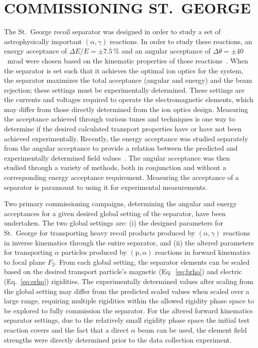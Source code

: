 \chapter{COMMISSIONING ST.\ GEORGE}

The St.\ George recoil separator was designed in order to study a set of
astrophysically important $(\alpha,\gamma)$ reactions. In order to study these
reactions, an energy acceptance of $\Delta E/E = \pm7.5$\,\% and an angular
acceptance of $\Delta\theta = \pm40$~mrad were chosen based on the kinematic
properties of those reactions~\cite{Couder2008}. When the separator is set
such that it achieves the optimal ion optics for the system, the separator
maximizes the total acceptance (angular and energy) and the beam rejection;
these settings must be experimentally determined. These settings are the
currents and voltages required to operate the electromagnetic elements, which
may differ from those directly determined from the ion optics design.
Measuring the acceptance achieved through various tunes and techniques is one
way to determine if the desired calculated transport properties have or have
not been achieved experimentally. Recently, the energy acceptance was studied
separately from the angular acceptance to provide a relation between the
predicted and experimentally determined field values~\cite{Meisel2017}. The
angular acceptance was then studied through a variety of methods, both in
conjunction and without a corresponding energy acceptance requirement.
Measuring the acceptance of a separator is paramount to using it for
experimental measurements.

Two primary commissioning campaigns, determining the angular and energy
acceptances for a given desired global setting of the separator, have been
undertaken. The two global settings are: (i) the designed parameters for St.\
George for transporting heavy recoil products produced by $(\alpha,\gamma)$
reactions in inverse kinematics through the entire separator, and (ii) the
altered parameters for transporting $\alpha$ particles produced by
$(\textrm{p},\alpha)$ reactions in forward kinematics to focal plane $F_2$.
From each global setting, the separator elements can be scaled based on the
desired transport particle's magnetic (Eq.~\ref{eq:brho}) and electric
(Eq.~\ref{eq:erho}) rigidities. The experimentally determined values after
scaling from the global setting may differ from the predicted scaled values
when scaled over a large range, requiring multiple rigidities within the
allowed rigidity phase space to be explored to fully commission the separator.
For the
altered forward kinematics separator settings, due to the relatively small
rigidity phase space the initial test reaction covers and the fact that a
direct $\alpha$ beam can be used, the element field strengths were directly
determined prior to the data collection experiment.

